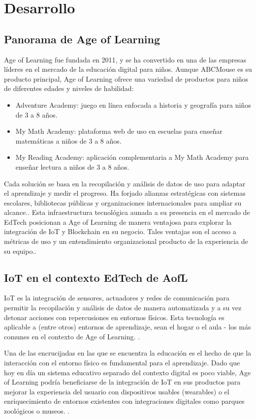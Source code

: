 \documentclass[conference]{IEEEtran}
\begin{document}
\section{Desarrollo}
\subsection{Panorama de Age of Learning}
Age of Learning fue fundada en 2011, y se ha convertido en una de las empresas líderes en el mercado de la educación digital para niños. Aunque ABCMouse es su producto principal, Age of Learning ofrece una variedad de productos para niños de diferentes edades y niveles de habilidad: 
\begin{itemize}
    \item Adventure Academy: juego en línea enfocada a historia y geografía para niños de 3 a 8 años.
    \item My Math Academy: plataforma web de uso en escuelas para enseñar matemáticas a niños de 3 a 8 años.
    \item My Reading Academy: aplicación complementaria a My Math Academy para enseñar lectura a niños de 3 a 8 años.
\end{itemize}
Cada solución se basa en la recopilación y análisis de datos de uso para adaptar el aprendizaje y medir el progreso.
Ha forjado alianzas estratégicas con sistemas escolares, bibliotecas públicas y organizaciones internacionales para ampliar su alcance.\cite{ageOfLearningWeb}.
Esta infraestructura tecnológica aunada a su presencia en el mercado de EdTech posicionan a Age of Learning de manera ventajosa para explorar la integración de IoT y Blockchain en su negocio. Tales ventajas son el acceso a métricas de uso y un entendimiento organizacional producto de la experiencia de su equipo.\cite{hoe2022digital}.

\subsection{IoT en el contexto EdTech de AofL}
IoT es la integración de sensores, actuadores y redes de comunicación para permitir la recopilación y análisis de datos de manera automatizada y a su vez detonar acciones con repercusiones en entornos físicos. Esta tecnología es aplicable a (entre otros) entornos de aprendizaje, sean el hogar o el aula - los más comunes en el contexto de Age of Learning. \cite{itainnova2020iotBlockchain}.

Una de las encrucijadas en las que se encuentra la educación es el hecho de que la interacción con el entorno físico es fundamental para el aprendizaje. Dado que hoy en día un sistema educativo separado del contexto digital es poco viable, Age of Learning podría beneficiarse de la integración de IoT en sus productos para mejorar la experiencia del usuario con dispositivos usables (wearables) o el enriquecimiento de entornos existentes con integraciones digitales como parques zoológicos o museos. \cite{sanchezRamoscelli2018iot}.
\end{document}

